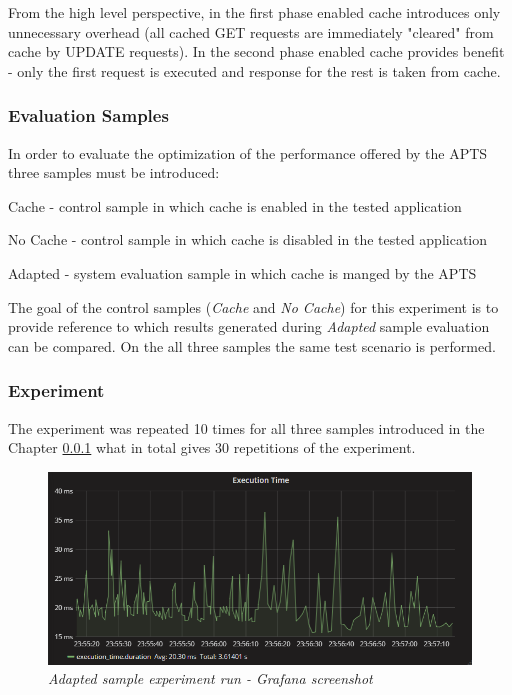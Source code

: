 \documentclass[12pt,a4paper]{article}
\let\tempone\itemize
\let\temptwo\enditemize
\renewenvironment{itemize}{\tempone\addtolength{\itemsep}{-0.4\baselineskip}}{\temptwo}
\begin{document}
From the high level perspective, in the first phase enabled cache introduces only unnecessary overhead (all cached GET requests are immediately "cleared" from cache by UPDATE requests). In the second phase enabled cache provides benefit - only the first request is executed and response for the rest is taken from cache.  

\subsubsection{Evaluation Samples} \label{evaluationsamplescache}

In order to evaluate the optimization of the performance offered by the APTS three  samples must be introduced: 
\begin{itemize}
\item Cache - control sample in which cache is enabled in the tested application
\item No Cache - control sample in which cache is disabled in the tested application
\item Adapted - system evaluation sample in which cache is manged by the APTS
\end{itemize}

The goal of the control samples (\textit{Cache} and \textit{No Cache}) for this experiment is to provide reference to which results generated during \textit{Adapted} sample evaluation can be compared. On the all three samples the same test scenario is performed. 



\subsubsection{Experiment} 

The experiment was repeated 10 times for all three samples introduced in the Chapter \ref{evaluationsamplescache} what in total gives 30 repetitions of the experiment.

\begin{figure}[!htb]
\centering
\includegraphics[width=1\textwidth]{cacheEval2}
\caption{\textit{Adapted sample experiment run - Grafana screenshot}} \label{figure:cachegraphanascreen}
\end{figure}
\end{document}
